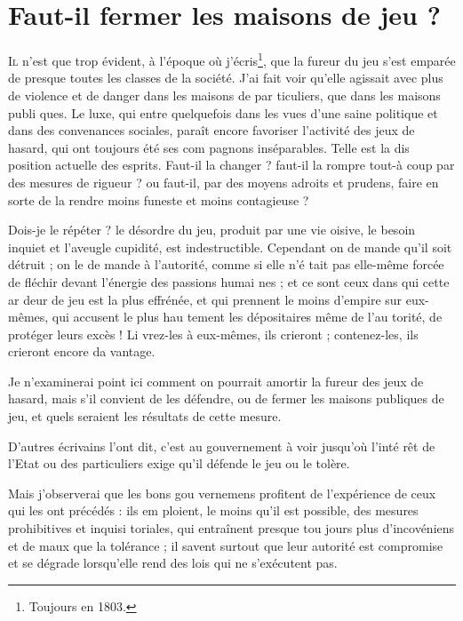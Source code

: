 \chapter{Faut-il fermer les maisons de jeu ?}


\lettrine{I}{l} n'est que trop évident, à l'époque
où j'écris\footnote{Toujours en 1803.}, que la fureur du jeu
s'est emparée de presque toutes les
classes de la société. J'ai fait voir
qu'elle agissait avec plus de violence
et de danger dans les maisons de par%
ticuliers, que dans les maisons publi%
ques. Le luxe, qui entre quelquefois
dans les vues d'une saine politique et
dans des convenances sociales, paraît
encore favoriser l'activité des jeux de
hasard, qui ont toujours été ses com%
pagnons inséparables. Telle est la dis%
position actuelle des esprits. Faut-il
la changer ? faut-il la rompre tout-à
coup par des mesures de rigueur ? ou
faut-il, par des moyens adroits et
prudens, faire en sorte de la rendre
moins funeste et moins contagieuse ?

Dois-je le répéter ? le désordre du
jeu, produit par une vie oisive, le
besoin inquiet et l'aveugle cupidité,
est indestructible. Cependant on de%
mande qu'il soit détruit ; on le de%
mande à l'autorité, comme si elle n'é%
tait pas elle-même forcée de fléchir
devant l'énergie des passions humai%
nes ; et ce sont ceux dans qui cette ar%
deur de jeu est la plus effrénée, et
qui prennent le moins d'empire sur
eux-mêmes, qui accusent le plus hau%
tement les dépositaires même de l'au%
torité, de protéger leurs excès ! Li%
vrez-les à eux-mêmes, ils crieront ;
contenez-les, ils crieront encore da%
vantage.

Je n'examinerai point ici comment
on pourrait amortir la fureur des
jeux de hasard, mais s'il convient de
les défendre, ou de fermer les maisons
publiques de jeu, et quels seraient les
résultats de cette mesure.

D'autres écrivains l'ont dit, c'est au
gouvernement à voir jusqu'où l'inté%
rêt de l'Etat ou des particuliers exige
qu'il défende le jeu ou le tolère.

Mais j'observerai que les bons gou%
vernemens profitent de l'expérience
de ceux qui les ont précédés : ils em%
ploient, le moins qu'il est possible,
des mesures prohibitives et inquisi%
toriales, qui entraînent presque tou%
jours plus d'incovéniens et de maux
que la tolérance ; il savent surtout
que leur autorité est compromise et se
dégrade lorsqu'elle rend des lois qui 
ne s'exécutent pas.

